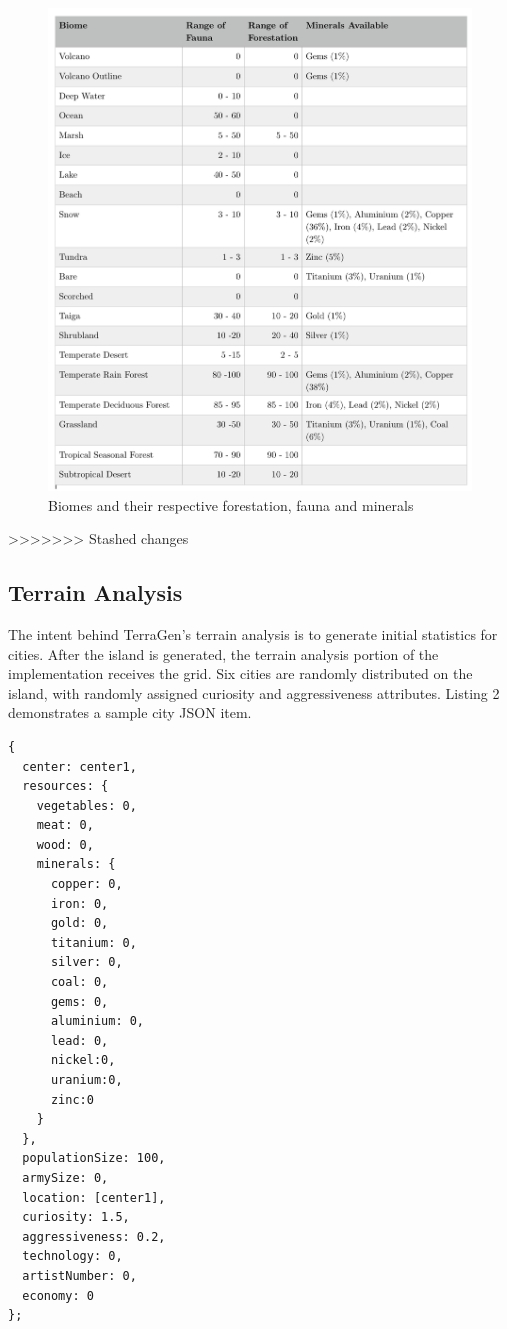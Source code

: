 \begin{figure}
\includegraphics[width=\textwidth]{AdditionalFeatures.png}
\caption{Biomes and their respective forestation, fauna and minerals}
\end{figure}
>>>>>>> Stashed changes

\subsection{Terrain Analysis}
The intent behind TerraGen's terrain analysis is to generate initial statistics for cities. After the island is generated, the terrain analysis portion of the implementation receives the grid. Six cities are randomly distributed on the island, with randomly assigned curiosity and aggressiveness attributes. Listing 2 demonstrates a sample city JSON item.

\begin{lstlisting}[caption=JSON City Item]
{
  center: center1,
  resources: {
    vegetables: 0,
    meat: 0,
    wood: 0,
    minerals: {
      copper: 0,
      iron: 0,
      gold: 0,
      titanium: 0,
      silver: 0,
      coal: 0,
      gems: 0,
      aluminium: 0,
      lead: 0,
      nickel:0,
      uranium:0,
      zinc:0
    }
  },
  populationSize: 100,
  armySize: 0,
  location: [center1],
  curiosity: 1.5,
  aggressiveness: 0.2,
  technology: 0,
  artistNumber: 0,
  economy: 0
};
\end{lstlisting}

